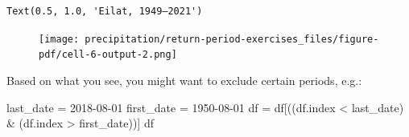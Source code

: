 \documentclass[
  letterpaper,
  DIV=11,
  numbers=noendperiod]{scrreprt}
\newenvironment{Shaded}{\begin{snugshade}}{\end{snugshade}}
\newcommand{\NormalTok}[1]{\textcolor[rgb]{0.00,0.23,0.31}{#1}}
\newcommand{\OperatorTok}[1]{\textcolor[rgb]{0.37,0.37,0.37}{#1}}
\newcommand{\StringTok}[1]{\textcolor[rgb]{0.13,0.47,0.30}{#1}}
\begin{document}
\begin{verbatim}
Text(0.5, 1.0, 'Eilat, 1949–2021')
\end{verbatim}

\begin{figure}[H]

{\centering \texttt{[image: precipitation/return-period-exercises\_files/figure-pdf/cell-6-output-2.png]}

}

\end{figure}

Based on what you see, you might want to exclude certain periods, e.g.:

\begin{Shaded}
\begin{Highlighting}[]
\NormalTok{last\_date }\OperatorTok{=} \StringTok{\textquotesingle{}2018{-}08{-}01\textquotesingle{}}
\NormalTok{first\_date }\OperatorTok{=} \StringTok{\textquotesingle{}1950{-}08{-}01\textquotesingle{}}
\NormalTok{df }\OperatorTok{=}\NormalTok{ df[((df.index }\OperatorTok{\textless{}}\NormalTok{ last\_date) }\OperatorTok{\&}\NormalTok{ (df.index }\OperatorTok{\textgreater{}}\NormalTok{ first\_date))]}
\NormalTok{df}
\end{Highlighting}
\end{Shaded}
\end{document}
